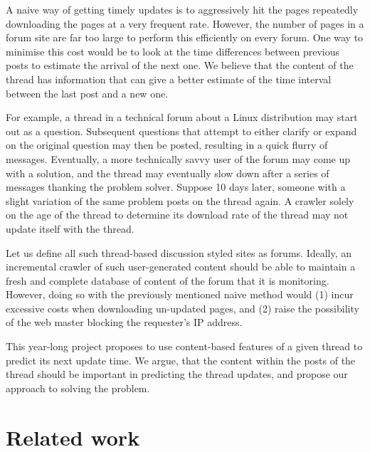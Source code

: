 \documentclass[12 pt]{article}
\begin{document}
A naive way of getting timely updates is to aggressively hit the pages repeatedly downloading the pages at a very frequent rate. However, the number of pages in a forum site are far too large to perform this efficiently on every forum. One way to minimise this cost would be to look at the time differences between previous posts to estimate the arrival of the next one. We believe that the content of the thread has information that can give a better estimate of the time interval between the last post and a new one.


For example, a thread in a technical forum about a Linux distribution may start out as a question. Subsequent questions that attempt to either clarify or expand on the original question may then be posted, resulting in a quick flurry of messages. Eventually, a more technically savvy user of the forum may come up with a solution, and the thread may eventually slow down after a series of messages thanking the problem solver. Suppose 10 days later, someone with a slight variation of the same problem posts on the thread again. A crawler solely on the age of the thread to determine its download rate of the thread may not update itself with the thread.

Let us define all such thread-based discussion styled sites as forums. Ideally, an incremental crawler of such user-generated content should be able to maintain a fresh and complete database of content of the forum that it is monitoring. However, doing so with the previously mentioned naive method would (1) incur excessive costs when downloading un-updated pages, and (2) raise the possibility of the web master blocking the requester's IP address.

This year-long project proposes to use content-based features of a given thread to predict its next update time. We argue, that the content within the posts of the thread should be important in predicting the thread updates, and propose our approach to solving the problem.

\section{Related work}
\end{document}
